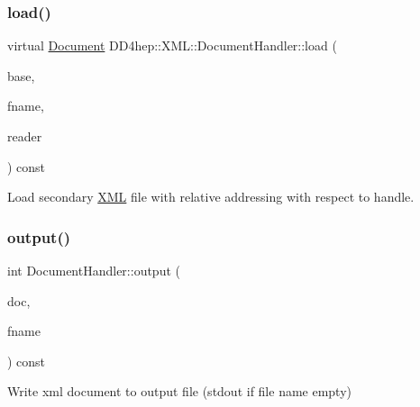 \subsubsection{\texorpdfstring{load()}{load()}\hspace{0.1cm}{\footnotesize\ttfamily [4/4]}}
{\footnotesize\ttfamily virtual \hyperlink{class_d_d4hep_1_1_x_m_l_1_1_document}{Document} D\+D4hep\+::\+X\+M\+L\+::\+Document\+Handler\+::load (\begin{DoxyParamCaption}\item[{\hyperlink{class_d_d4hep_1_1_x_m_l_1_1_handle__t}{Handle\+\_\+t}}]{base,  }\item[{const \hyperlink{namespace_d_d4hep_1_1_x_m_l_a09e5d9cc86ed782f6826dfe0778c1815}{Xml\+Char} $\ast$}]{fname,  }\item[{\hyperlink{class_d_d4hep_1_1_x_m_l_1_1_uri_reader}{Uri\+Reader} $\ast$}]{reader }\end{DoxyParamCaption}) const\hspace{0.3cm}{\ttfamily [virtual]}}



Load secondary \hyperlink{namespace_d_d4hep_1_1_x_m_l}{X\+ML} file with relative addressing with respect to handle. 

\hypertarget{class_d_d4hep_1_1_x_m_l_1_1_document_handler_a09d1b5a74ed2515dfcdd40ec826c2eb5}{}\label{class_d_d4hep_1_1_x_m_l_1_1_document_handler_a09d1b5a74ed2515dfcdd40ec826c2eb5} 
\subsubsection{\texorpdfstring{output()}{output()}}
{\footnotesize\ttfamily int Document\+Handler\+::output (\begin{DoxyParamCaption}\item[{\hyperlink{class_d_d4hep_1_1_x_m_l_1_1_document}{Document}}]{doc,  }\item[{const std\+::string \&}]{fname }\end{DoxyParamCaption}) const\hspace{0.3cm}{\ttfamily [virtual]}}



Write xml document to output file (stdout if file name empty) 



